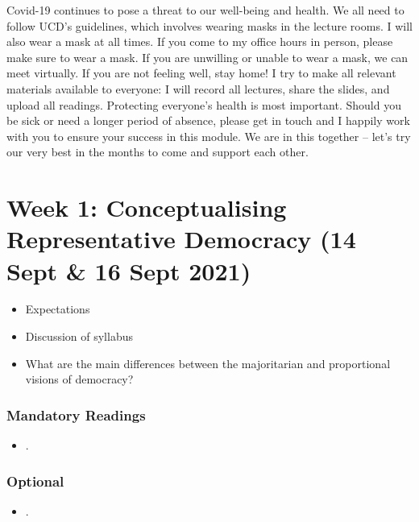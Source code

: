 \documentclass[abstract=on,parskip=full,headings=standardclasses,fontsize=11pt,paper=a4]{scrartcl}
\begin{document}
Covid-19 continues to pose a threat to our well-being and health. We all need to follow UCD's guidelines, which involves wearing masks in the lecture rooms. I will also wear  a mask at all times. If you come to my office hours in person, please make sure to wear a mask. If you are unwilling or unable to wear a mask, we can meet virtually. If you are not feeling well, stay home! I try to make all relevant materials available to everyone: I will record all lectures, share the slides, and upload all readings. Protecting everyone's health is most important. Should you be sick or need a longer period of absence, please get in touch  and I happily work with you to ensure your success in this module. We are in this together -- let's try our very best in the months to come and support each other.





\tableofcontents

\section{Week 1: Conceptualising Representative Democracy (14 Sept \& 16 Sept 2021)}

\begin{itemize}
\renewcommand\labelitemi{--}
\item Expectations
\item Discussion of syllabus
\item What are the main differences between the majoritarian and proportional visions of democracy?
\end{itemize}




\subsubsection*{Mandatory Readings}
\begin{itemize}
\item {}.

\end{itemize}


\subsubsection*{Optional}
\begin{itemize}
\item {}.
\end{itemize}
\end{document}
